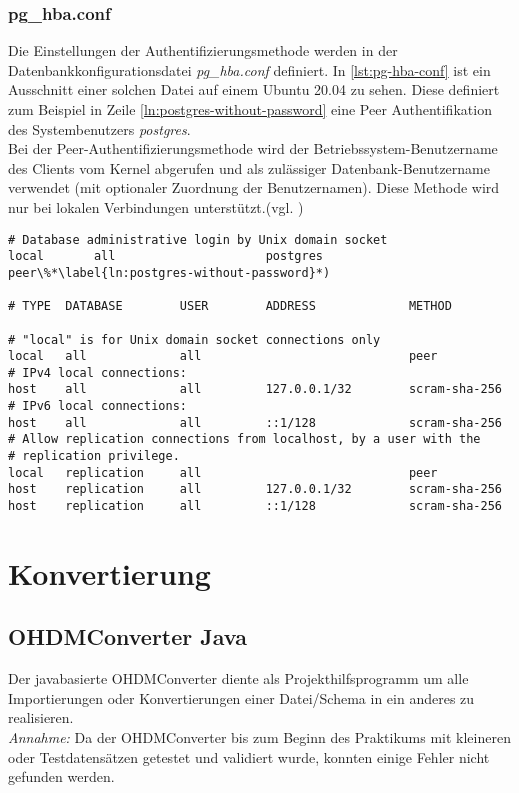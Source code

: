 \newpage
\subsection{pg\_hba.conf}
Die Einstellungen der Authentifizierungsmethode werden in der Datenbankkonfigurationsdatei \textit{pg\_hba.conf} definiert. In \autoref{lst:pg-hba-conf} ist ein Ausschnitt einer solchen Datei auf einem Ubuntu 20.04 zu sehen. Diese definiert zum Beispiel in Zeile \ref{ln:postgres-without-password} eine Peer Authentifikation des Systembenutzers \textit{postgres}.\\
Bei der Peer-Authentifizierungsmethode wird der Betriebssystem-Benutzername des Clients vom Kernel abgerufen und als zulässiger Datenbank-Benutzername verwendet (mit optionaler Zuordnung der Benutzernamen). Diese Methode wird nur bei lokalen Verbindungen unterstützt.(vgl. \autocite{peer-authentification})
\begin{lstlisting}[caption={pg\_hba.conf Ausschnitt},label={lst:pg-hba-conf},deletekeywords={all}]
# Database administrative login by Unix domain socket
local		all				 		postgres	       					     peer\%*\label{ln:postgres-without-password}*)

# TYPE  DATABASE    	USER        ADDRESS             METHOD

# "local" is for Unix domain socket connections only
local   all         	all                             peer
# IPv4 local connections:
host    all         	all         127.0.0.1/32        scram-sha-256
# IPv6 local connections:
host    all         	all         ::1/128             scram-sha-256
# Allow replication connections from localhost, by a user with the
# replication privilege.
local   replication 	all                             peer
host    replication 	all         127.0.0.1/32        scram-sha-256
host    replication 	all         ::1/128             scram-sha-256
\end{lstlisting}

\chapter{Konvertierung}
\section{OHDMConverter Java}
Der javabasierte OHDMConverter diente als Projekthilfsprogramm um alle Importierungen oder Konvertierungen einer Datei/Schema in ein anderes zu realisieren.\\
\textit{Annahme:} Da der OHDMConverter bis zum Beginn des Praktikums  mit kleineren oder Testdatensätzen getestet und validiert wurde, konnten einige Fehler nicht gefunden werden.


